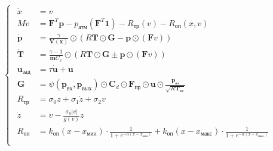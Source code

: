 \begin{equation}
    \begin{cases}
        \begin{alignedat}{2}
            \dot{x}               & = v                                                                                                                                                                                                   \\
            M\dot{v}              & = \mathbf{F}^T\mathbf{p} - p_\text{атм}(\mathbf{F}^T\mathbf{1}) - R_\text{тр}(v) - R_\text{оп}(x, v)                                                                                                  \\
            \dot{\mathbf{p}}      & = \frac{\gamma}{\mathbf{V}(\mathbf{x})} \odot (R\mathbf{T} \odot \mathbf{G} - \mathbf{p} \odot (\mathbf{F}v))                                                                                         \\
            \dot{\mathbf{T}}      & = \frac{\gamma-1}{\mathbf{m}C_v} \odot (R\mathbf{T} \odot \mathbf{G} \pm \mathbf{p} \odot (\mathbf{F}v))                                                                                              \\
            \mathbf{u}_\text{зад} & = \tau \dot{\mathbf{u}} + \mathbf{u}                                                                                                                                                                  \\
            \mathbf{G}            & = \psi(\mathbf{p}_\text{вх}, \mathbf{p}_\text{вых}) \odot \mathbf{C}_d \odot \mathbf{F}_\text{пр} \odot \mathbf{u} \odot \frac{\mathbf{p}_\text{вх}}{\sqrt{R\mathbf{T}_\text{вх}}}                    \\
            R_\text{тр} &= \sigma_0 z + \sigma_1 \dot{z} + \sigma_2 v                                                                                                                              \\
            \dot{z} &= v - \frac{\sigma_0 |v|}{g(v)}z \\
            R_\text{оп}           & = k_\text{оп}(x - x_\text{мин})\cdot \frac{1}{1 + e^{-\alpha(x - x_\text{мин})}} + k_\text{оп}(x - x_\text{макс})\cdot \frac{1}{1 + e^{-\alpha(x - x_\text{макс})}}                                   \\
        \end{alignedat}
    \end{cases}
\end{equation}

